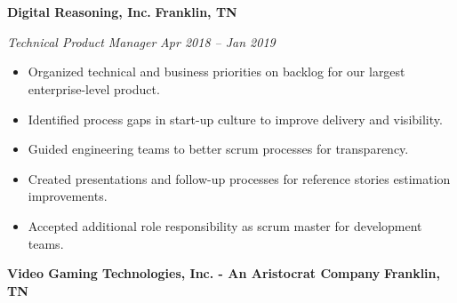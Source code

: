 \section{}

\vspace{8pt} %

{\bf Digital Reasoning, Inc. } \hfill {\bf Franklin, TN}

{\sl Technical Product Manager} \hfill {\sl Apr 2018 -- Jan 2019} 
\begin{itemize} 
\item Organized technical and business priorities on backlog for our largest enterprise-level product.
\item Identified process gaps in start-up culture to improve delivery and visibility.
\item Guided engineering teams to better scrum processes for transparency.
\item Created presentations and follow-up processes for reference stories estimation improvements.
\item Accepted additional role responsibility as scrum master for development teams.
\end{itemize}

\vspace{8pt} %

{\bf Video Gaming Technologies, Inc. - An Aristocrat Company} \hfill {\bf Franklin, TN}

